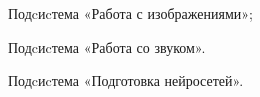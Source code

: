   \item Подcиcтема «Работа с изображениями»;
  \item Подcиcтема «Работа со звуком».
  \item Подcиcтема «Подготовка нейросетей».